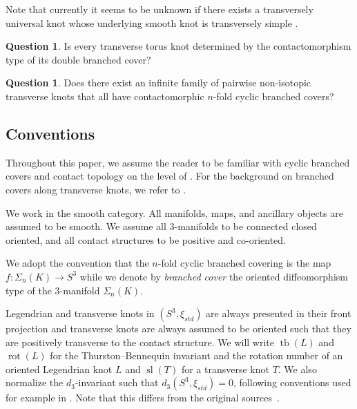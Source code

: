 \documentclass[11pt]{amsart}
\theoremstyle{definition}
\theoremstyle{definition}
\theoremstyle{definition}
\theoremstyle{definition}
\newtheorem{question}[theorem]{Question}
\begin{document}
 Note that currently it seems to be unknown if there exists a transversely universal knot whose underlying smooth knot is transversely simple \cite{Rodriguez-Viorato,Zapata,Casals_etnyre,Ng_Ozsvath_Thurston,Birman_Menasco,Etnyre_torus_knots,Etynre_honda_Cabling,Vertesi_Ng_etynre}.

\begin{question}
    Is every transverse torus knot determined by the contactomorphism type of its double branched cover?
\end{question}

\begin{question}
    Does there exist an infinite family of pairwise non-isotopic transverse knots that all have contactomorphic $n$-fold cyclic branched covers?
\end{question}



\subsection*{Conventions}

Throughout this paper, we assume the reader to be familiar with cyclic branched covers and contact topology on the level of \cite{Geiges,Paoluzzi_survey}. For the background on branched covers along transverse knots, we refer to \cite{Plamenevskaya_DBC}.

We work in the smooth category. All manifolds, maps, and ancillary objects are assumed to be smooth. We assume all $3$-manifolds to be connected closed oriented, and all contact structures to be positive and co-oriented. 

We adopt the convention that the $n$-fold cyclic branched covering is the map $f\colon \Sigma_n(K)\rightarrow S^3$ while we denote by \textit{branched cover} the oriented diffeomorphism type of the $3$-manifold $\Sigma_n(K)$. 

Legendrian and transverse knots in $(S^3,\xi_{std})$ are always presented in their front projection and transverse knots are always assumed to be oriented such that they are positively transverse to the contact structure. We will write $\operatorname{tb}(L)$ and $\operatorname{rot}(L)$ for the Thurston--Bennequin invariant and the rotation number of an oriented Legendrian knot $L$ and $\operatorname{sl}(T)$ for a transverse knot $T$. We also normalize the $d_3$-invariant such that $d_3(S^3,\xi_{std})=0$, following conventions used for example in \cite{EKS_contact_surgery_numbers,Kegel_Onaran,Casals_Etnyre_Kegel,ChatterjeeKegel,KegelYadav,surgery_distance}. Note that this differs from the original sources~\cite{Gompf_Stein,DingGeigesStipsicz_surgery}.
\end{document}
